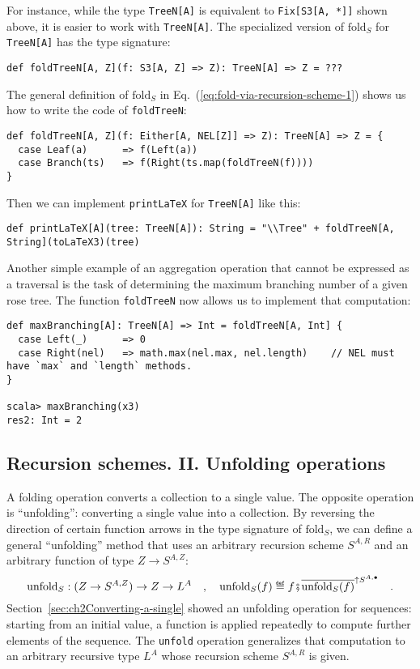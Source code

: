 For instance, while the type \lstinline!TreeN[A]! is equivalent to
\lstinline!Fix[S3[A, *]]! shown above, it is easier to work with
\lstinline!TreeN[A]!. The specialized version of $\text{fold}_{S}$
for \lstinline!TreeN[A]! has the type signature:
\begin{lstlisting}
def foldTreeN[A, Z](f: S3[A, Z] => Z): TreeN[A] => Z = ???
\end{lstlisting}
The general definition of $\text{fold}_{S}$ in Eq.~(\ref{eq:fold-via-recursion-scheme-1})
shows us how to write the code of \lstinline!foldTreeN!: 
\begin{lstlisting}
def foldTreeN[A, Z](f: Either[A, NEL[Z]] => Z): TreeN[A] => Z = {
  case Leaf(a)      => f(Left(a))
  case Branch(ts)   => f(Right(ts.map(foldTreeN(f))))
}
\end{lstlisting}
Then we can implement \lstinline!printLaTeX! for \lstinline!TreeN[A]!
like this:
\begin{lstlisting}
def printLaTeX[A](tree: TreeN[A]): String = "\\Tree" + foldTreeN[A, String](toLaTeX3)(tree)
\end{lstlisting}

Another simple example of an aggregation operation that cannot be
expressed as a traversal is the task of determining the maximum branching
number of a given rose tree. The function \lstinline!foldTreeN! now
allows us to implement that computation:
\begin{lstlisting}
def maxBranching[A]: TreeN[A] => Int = foldTreeN[A, Int] {
  case Left(_)      => 0
  case Right(nel)   => math.max(nel.max, nel.length)    // NEL must have `max` and `length` methods.
}

scala> maxBranching(x3)
res2: Int = 2
\end{lstlisting}


\subsection{Recursion schemes. II. Unfolding operations}

A folding operation converts a collection to a single value. The opposite
operation is \textsf{``}unfolding\textsf{''}: converting a single value into a collection.
By reversing the direction of certain function arrows in the type
signature of $\text{fold}_{S}$, we can define a general \textsf{``}unfolding\textsf{''}
method that uses an arbitrary recursion scheme $S^{A,R}$ and an arbitrary
function of type $Z\rightarrow S^{A,Z}$:
\begin{equation}
\text{unfold}_{S}:(Z\rightarrow S^{A,Z})\rightarrow Z\rightarrow L^{A}\quad,\quad\text{unfold}_{S}(f)\triangleq f\bef\overline{\text{unfold}_{S}(f)}^{\uparrow S^{A,\bullet}}\quad.\label{eq:unfold-via-recursion-scheme}
\end{equation}
Section~\ref{sec:ch2Converting-a-single} showed an unfolding operation
for sequences: starting from an initial value, a function is applied
repeatedly to compute further elements of the sequence. The \lstinline!unfold!
operation generalizes that computation to an arbitrary recursive type
$L^{A}$ whose recursion scheme $S^{A,R}$ is given. 


